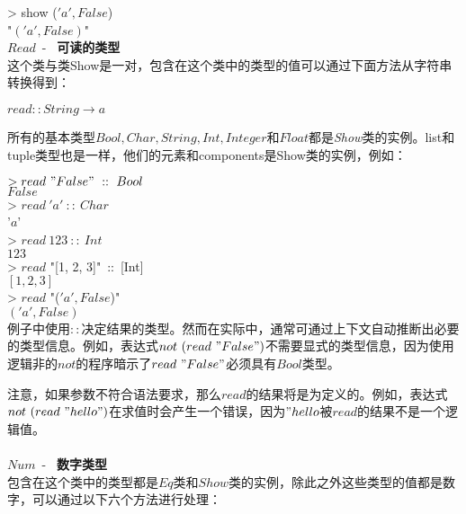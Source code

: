 \noindent\hspace*{1cm} > show ($'a', False$)\\
\hspace*{1cm} "$('a', False)$"\\

\noindent$Read$~-~ \textbf{可读的类型}\\
这个类与类Show是一对，包含在这个类中的类型的值可以通过下面方法从字符串转换得到：

\noindent\hspace*{1cm} $read:: String \rightarrow a$

所有的基本类型$Bool, Char, String, Int,
Integer$和$Float$都是\textit{Show}类的实例。list和tuple类型也是一样，他们的元素和components是Show类的实例，例如：

\noindent\hspace*{1cm} $> read~"False"~::~Bool$\\
\hspace*{1cm} $False$\\

\noindent\hspace*{1cm} > $read~'a'~::~Char$\\
\hspace*{1cm} '$a$'\\

\noindent\hspace*{1cm} > $read~123~::~Int$\\
\hspace*{1cm} $123$\\

\noindent\hspace*{1cm} > $read$ "[1, 2, 3]"~::~[Int]\\
\hspace*{1cm} $[1, 2, 3]$\\

\noindent\hspace*{1cm} > $read$ "($'a', False$)"\\
\hspace*{1cm} $('a', False)$\\

例子中使用$::$决定结果的类型。然而在实际中，通常可通过上下文自动推断出必要的类型信息。例如，表达式$not~(read~
"False")$不需要显式的类型信息，因为使用逻辑非的$not$的程序暗示了$read~
"False"$必须具有$Bool$类型。

注意，如果参数不符合语法要求，那么$read$的结果将是为定义的。例如，表达式$not~(read~
"hello")$在求值时会产生一个错误，因为$"hello$被$read$的结果不是一个逻辑值。
\\
\\
\noindent$Num$~-~ \textbf{数字类型}\\
包含在这个类中的类型都是$Eq$类和$Show$类的实例，除此之外这些类型的值都是数字，可以通过以下六个方法进行处理：


